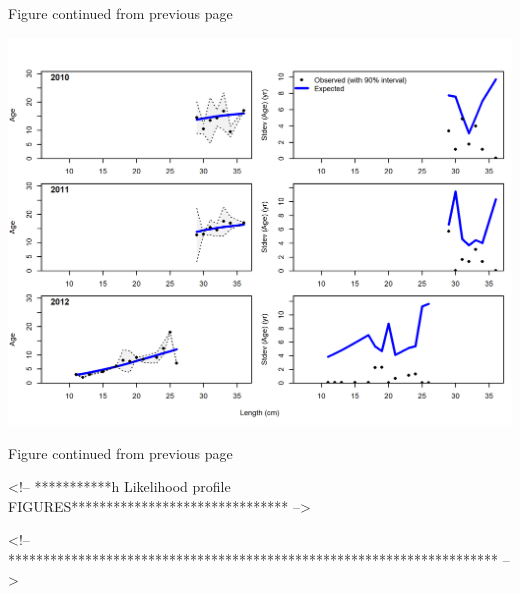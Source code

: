 \documentclass[12pt,]{article}
\begin{document}
\begin{center} 

              Figure continued from previous page 

             \end{center}

\includegraphics{./r4ss/plots_mod1/comp_condAALfit_Andre_plotsflt12mkt0_page5.png}

\begin{center} 

              Figure continued from previous page 

             \end{center}

\FloatBarrier

\FloatBarrier

\FloatBarrier
<!-- ***********h Likelihood profile FIGURES******************************* -->

\FloatBarrier
<!-- ********************************************************************** -->
\end{document}
